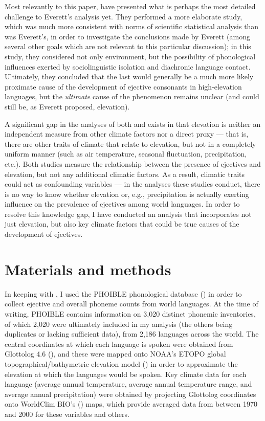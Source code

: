 \documentclass{article}
\begin{document}
Most relevantly to this paper, \textcite{urban2021} have presented what is perhaps the most detailed challenge to Everett's analysis yet. They performed a more elaborate study, which was much more consistent with norms of scientific statistical analysis than was Everett's, in order to investigate the conclusions made by Everett (among several other goals which are not relevant to this particular discussion); in this study, they considered not only environment, but the possibility of phonological influences exerted by sociolinguistic isolation and diachronic language contact. Ultimately, they concluded that the last would generally be a much more likely proximate cause of the development of ejective consonants in high-elevation languages, but the \emph{ultimate} cause of the phenomenon remains unclear (and could still be, as Everett proposed, elevation).

A significant gap in the analyses of both \textcite{everett2013} and \textcite{urban2021} exists in that elevation is neither an independent measure from other climate factors nor a direct proxy --- that is, there are other traits of climate that relate to elevation, but not in a completely uniform manner (such as air temperature, seasonal fluctuation, precipitation, etc.). Both studies measure the relationship between the presence of ejectives and elevation, but not any additional climatic factors. As a result, climatic traits could act as confounding variables --- in the analyses these studies conduct, there is no way to know whether elevation or, e.g., precipitation is actually exerting influence on the prevalence of ejectives among world languages. In order to resolve this knowledge gap, I have conducted an analysis that incorporates not just elevation, but also key climate factors that could be true causes of the development of ejectives.

\section{Materials and methods}

In keeping with \textcite{urban2021}, I used the PHOIBLE phonological database (\cite{phoible}) in order to collect ejective and overall phoneme counts from world languages. At the time of writing, PHOIBLE contains information on 3,020 distinct phonemic inventories, of which 2,020 were ultimately included in my analysis (the others being duplicates or lacking sufficient data), from 2,186 languages across the world. The central coordinates at which each language is spoken were obtained from Glottolog 4.6 (\cite{glottolog}), and these were mapped onto NOAA's ETOPO global topographical/bathymetric elevation model (\cite{etopo}) in order to approximate the elevation at which the languages would be spoken. Key climate data for each language (average annual temperature, average annual temperature range, and average annual precipitation) were obtained by projecting Glottolog coordinates onto WorldClim BIO's (\cite{worldclim}) maps, which provide averaged data from between 1970 and 2000 for these variables and others.
\end{document}
